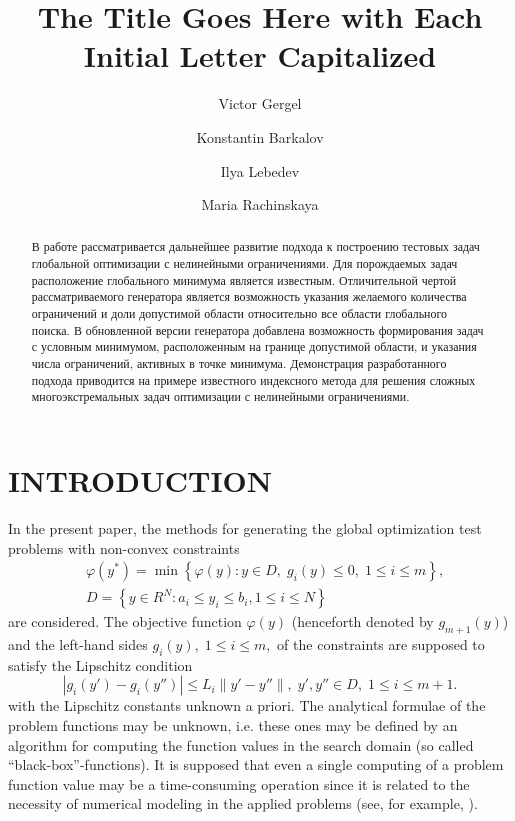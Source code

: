 \documentclass{aip-cp}
\begin{document}
\title{The Title Goes Here with Each Initial Letter Capitalized}

\author{Victor Gergel}
\author{Konstantin Barkalov}
\author{Ilya Lebedev}
\author{Maria Rachinskaya}


\maketitle

\begin{abstract}
В работе рассматривается дальнейшее развитие подхода к построению тестовых задач глобальной оптимизации с нелинейными ограничениями. Для порождаемых задач расположение глобального минимума является известным.
Отличительной чертой рассматриваемого генератора является возможность указания желаемого количества ограничений и доли допустимой области относительно все области глобального поиска. В обновленной версии генератора добавлена возможность формирования задач с условным минимумом, расположенным на границе допустимой области, и указания числа ограничений, активных в точке минимума. Демонстрация разработанного подхода приводится на примере известного индексного метода для решения сложных многоэкстремальных задач оптимизации с нелинейными ограничениями.
\end{abstract}

\section{INTRODUCTION}

In the present paper, the methods for generating the global optimization test problems with non-convex constraints
\begin{eqnarray}
&\varphi(y^\ast)=\min{\left\{\varphi(y):y\in D, \; g_i(y)\leq 0, \; 1 \leq i \leq m\right\}}, \label{i_problem} \\
&D=\left\{y\in R^N: a_i\leq y_i \leq b_i, 1\leq i \leq N\right\} \label{D}
\end{eqnarray}
are considered. The objective function $\varphi(y)$ (henceforth denoted by $g_{m+1}(y)$) and the left-hand sides $g_i(y), \; 1\leq i \leq m,$ of the constraints are supposed to satisfy the Lipschitz condition
\[ \left|g_i(y')-g_i (y'')\right| \leq L_i \left\|y'-y'' \right\|, \; y',y''\in D, \; 1\leq i \leq m+1. \]
with the Lipschitz constants unknown a priori. The analytical formulae of the problem functions may be unknown, i.e. these ones may be defined by an algorithm for computing the function values in the search domain (so called ``black-box''-functions). It is supposed that even a single computing of a problem function value may be a time-consuming operation since it is related to the necessity of numerical modeling in the applied problems (see, for example, \cite{Menniti2008,Kvasov2015,Modorskii2017}).
\end{document}
